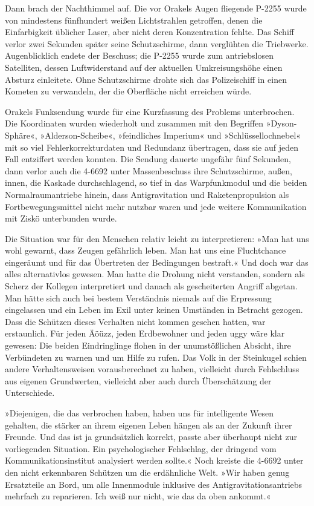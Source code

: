 Dann brach der Nachthimmel auf. Die vor Orakels Augen fliegende P-2255 wurde von mindestens fünfhundert weißen Lichtstrahlen getroffen, denen die Einfarbigkeit üblicher Laser, aber nicht deren Konzentration fehlte. Das Schiff verlor zwei Sekunden später seine Schutzschirme, dann verglühten die Triebwerke. Augenblicklich endete der Beschuss; die P-2255 wurde zum antriebslosen Satelliten, dessen Luftwiderstand auf der aktuellen Umkreisungshöhe einen Absturz einleitete. Ohne Schutzschirme drohte sich das Polizeischiff in einen Kometen zu verwandeln, der die Oberfläche nicht erreichen würde.

Orakels Funksendung wurde für eine Kurzfassung des Problems unterbrochen. Die Koordinaten wurden wiederholt und zusammen mit den Begriffen »Dyson-Sphäre«, »Alderson-Scheibe«, »feindliches Imperium« und »Schlüssellochnebel« mit so viel Fehlerkorrekturdaten und Redundanz übertragen, dass sie auf jeden Fall entziffert werden konnten. Die Sendung dauerte ungefähr fünf Sekunden, dann verlor auch die 4-6692 unter Massenbeschuss ihre Schutzschirme, außen, innen, die Kaskade durchschlagend, so tief in das Warpfunkmodul und die beiden Normalraumantriebe hinein, dass Antigravitation und Raketenpropulsion als Fortbewegungsmittel nicht mehr nutzbar waren und jede weitere Kommunikation mit Ziskö unterbunden wurde.

Die Situation war für den Menschen relativ leicht zu interpretieren: »Man hat uns wohl gewarnt, dass Zeugen gefährlich leben. Man hat uns eine Fluchtchance eingeräumt und für das Übertreten der Bedingungen bestraft.« Und doch war das alles alternativlos gewesen. Man hatte die Drohung nicht verstanden, sondern als Scherz der Kollegen interpretiert und danach als gescheiterten Angriff abgetan. Man hätte sich auch bei bestem Verständnis niemals auf die Erpressung eingelassen und ein Leben im Exil unter keinen Umständen in Betracht gezogen. Dass die Schützen dieses Verhalten nicht kommen gesehen hatten, war erstaunlich. Für jeden Äöüzz, jeden Erdbewohner und jeden uggy wäre klar gewesen: Die beiden Eindringlinge flohen in der unumstößlichen Absicht, ihre Verbündeten zu warnen und um Hilfe zu rufen. Das Volk in der Steinkugel schien andere Verhaltensweisen vorausberechnet zu haben, vielleicht durch Fehlschluss aus eigenen Grundwerten, vielleicht aber auch durch Überschätzung der Unterschiede.

»Diejenigen, die das verbrochen haben, haben uns für intelligente Wesen gehalten, die stärker an ihrem eigenen Leben hängen als an der Zukunft ihrer Freunde. Und das ist ja grundsätzlich korrekt, passte aber überhaupt nicht zur vorliegenden Situation. Ein psychologischer Fehlschlag, der dringend vom Kommunikationsinstitut analysiert werden sollte.« Noch kreiste die 4-6692 unter den nicht erkennbaren Schützen um die erdähnliche Welt. »Wir haben genug Ersatzteile an Bord, um alle Innenmodule inklusive des Antigravitationsantriebs mehrfach zu reparieren. Ich weiß nur nicht, wie das da oben ankommt.«

